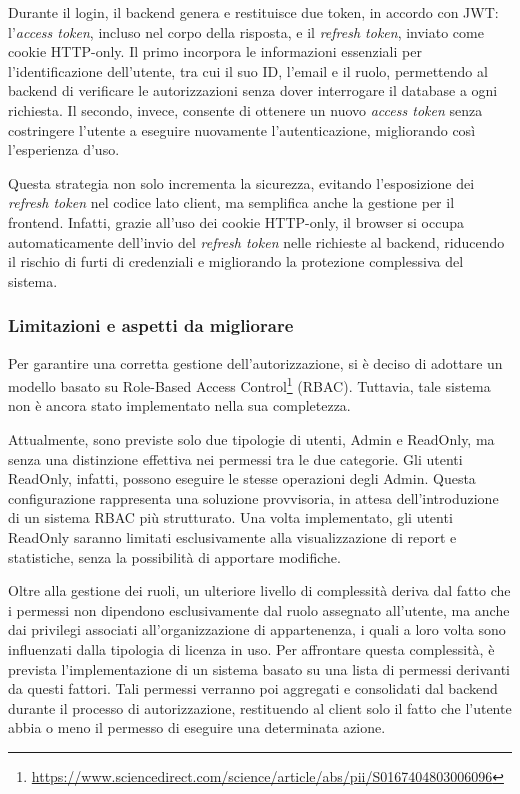 Durante il login, il backend genera e restituisce due token, in accordo con JWT: l'\textit{access token}, incluso nel corpo della risposta, e il \textit{refresh token}, inviato come cookie HTTP-only. Il primo incorpora le informazioni essenziali per l'identificazione dell'utente, tra cui il suo ID, l'email e il ruolo, permettendo al backend di verificare le autorizzazioni senza dover interrogare il database a ogni richiesta. Il secondo, invece, consente di ottenere un nuovo \textit{access token} senza costringere l'utente a eseguire nuovamente l'autenticazione, migliorando così l'esperienza d'uso.

Questa strategia non solo incrementa la sicurezza, evitando l’esposizione dei \textit{refresh token} nel codice lato client, ma semplifica anche la gestione per il frontend. Infatti, grazie all'uso dei cookie HTTP-only, il browser si occupa automaticamente dell'invio del \textit{refresh token} nelle richieste al backend, riducendo il rischio di furti di credenziali e migliorando la protezione complessiva del sistema.

\subsubsection{Limitazioni e aspetti da migliorare}
Per garantire una corretta gestione dell'autorizzazione, si è deciso di adottare un modello basato su Role-Based Access Control\footnote{\url{https://www.sciencedirect.com/science/article/abs/pii/S0167404803006096}} (RBAC). Tuttavia, tale sistema non è ancora stato implementato nella sua completezza.

Attualmente, sono previste solo due tipologie di utenti, Admin e ReadOnly, ma senza una distinzione effettiva nei permessi tra le due categorie. Gli utenti ReadOnly, infatti, possono eseguire le stesse operazioni degli Admin. Questa configurazione rappresenta una soluzione provvisoria, in attesa dell'introduzione di un sistema RBAC più strutturato. Una volta implementato, gli utenti ReadOnly saranno limitati esclusivamente alla visualizzazione di report e statistiche, senza la possibilità di apportare modifiche.

Oltre alla gestione dei ruoli, un ulteriore livello di complessità deriva dal fatto che i permessi non dipendono esclusivamente dal ruolo assegnato all'utente, ma anche dai privilegi associati all’organizzazione di appartenenza, i quali a loro volta sono influenzati dalla tipologia di licenza in uso. Per affrontare questa complessità, è prevista l'implementazione di un sistema basato su una lista di permessi derivanti da questi fattori. Tali permessi verranno poi aggregati e consolidati dal backend durante il processo di autorizzazione, restituendo al client solo il fatto che l'utente abbia o meno il permesso di eseguire una determinata azione.


